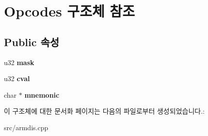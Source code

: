 \hypertarget{struct_opcodes}{}\section{Opcodes 구조체 참조}
\label{struct_opcodes}
\subsection*{Public 속성}
\begin{DoxyCompactItemize}
\item 
\mbox{\label{struct_opcodes_a78e77d19cd457c2d1a665ccbcc5fef41}} 
u32 {\bfseries mask}
\item 
\mbox{\label{struct_opcodes_ad17d40d63e52c5714a043cc7287046e7}} 
u32 {\bfseries cval}
\item 
\mbox{\label{struct_opcodes_a1999a6e81f58365cbd0164e5626d445a}} 
char $\ast$ {\bfseries mnemonic}
\end{DoxyCompactItemize}


이 구조체에 대한 문서화 페이지는 다음의 파일로부터 생성되었습니다.\+:\begin{DoxyCompactItemize}
\item 
src/armdis.\+cpp\end{DoxyCompactItemize}
